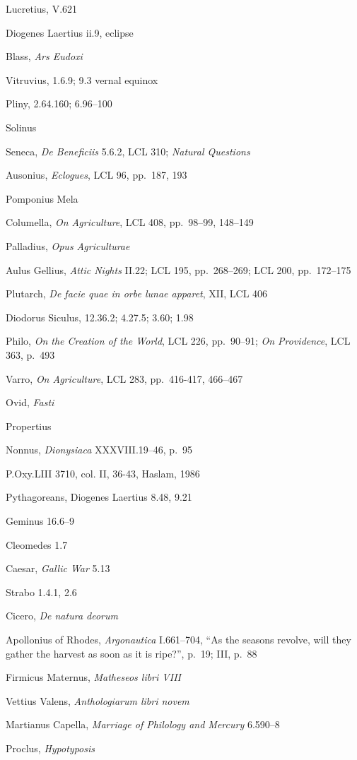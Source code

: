 \documentclass{amsart}
\theoremstyle{definition}
\begin{document}
Lucretius, V.621

Diogenes Laertius ii.9, eclipse

Blass, {\em Ars Eudoxi} 

Vitruvius, 1.6.9; 9.3 vernal equinox

Pliny, 2.64.160; 6.96--100

Solinus

Seneca, {\em De Beneficiis} 5.6.2, LCL 310; {\em Natural Questions}

Ausonius, {\em Eclogues}, LCL 96, pp.~187, 193

Pomponius Mela

Columella, {\em On Agriculture}, LCL 408, pp.~98--99, 148--149

Palladius, {\em Opus Agriculturae}

Aulus Gellius, {\em Attic Nights} II.22; LCL 195, pp.~268--269; LCL 200, pp.~172--175

Plutarch, {\em De facie quae in orbe lunae apparet}, XII, LCL 406

Diodorus Siculus, 12.36.2; 4.27.5; 3.60; 1.98

Philo, {\em On the Creation of the World}, LCL 226, pp.~90--91; {\em On Providence}, LCL 363, p.~493

Varro, {\em On Agriculture}, LCL 283, pp.~416-417, 466--467

Ovid, {\em Fasti}

Propertius

Nonnus, {\em Dionysiaca} XXXVIII.19--46, p.~95

P.Oxy.LIII 3710, col. II, 36-43, Haslam, 1986

Pythagoreans, Diogenes Laertius 8.48, 9.21 

Geminus 16.6--9

Cleomedes 1.7

Caesar, {\em Gallic War} 5.13

Strabo 1.4.1, 2.6

Cicero, {\em De natura deorum}

Apollonius of Rhodes, {\em Argonautica} I.661--704, ``As the seasons revolve, will they gather the harvest as soon as 
it is ripe?'', p.~19; III, p.~88

Firmicus Maternus, {\em Matheseos libri VIII}

Vettius Valens, {\em Anthologiarum libri novem}

Martianus Capella, {\em Marriage of Philology and Mercury} 6.590--8

Proclus, {\em Hypotyposis}
\end{document}
